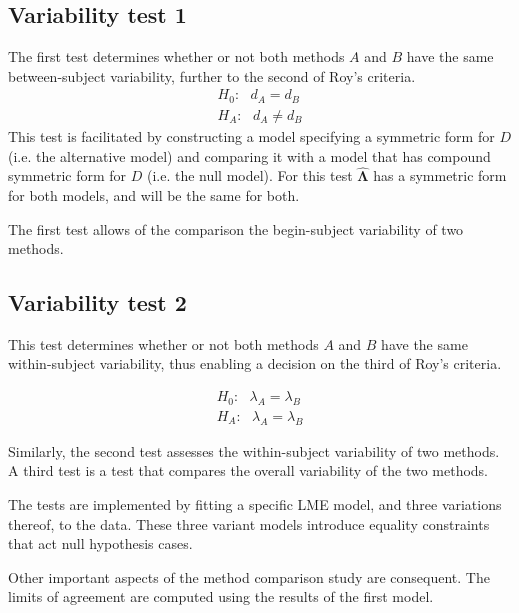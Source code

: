 \documentclass[12pt, a4paper]{article}
\theoremstyle{plain}
\theoremstyle{definition}
\theoremstyle{remark}
\begin{document}
			\subsection*{Variability test 1}
			The first test determines whether or not both methods $A$ and $B$ have the same between-subject variability, further to the second of Roy's criteria.
			\begin{eqnarray*}
				H_{0}: \mbox{ }d_{A}  = d_{B} \\
				H_{A}: \mbox{ }d_{A}  \neq d_{B}
			\end{eqnarray*}
			This test is facilitated by constructing a model specifying a symmetric form for $D$ (i.e. the alternative model) and comparing it with a model that has compound symmetric form for $D$ (i.e. the null model). For this test $\boldsymbol{\hat{\Lambda}}$ has a symmetric form for both models, and will be the same for both.
			

			
	The first test allows of the comparison the begin-subject variability of two methods. 
				\subsection*{Variability test 2}
				
				This test determines whether or not both methods $A$ and $B$ have the same within-subject variability, thus enabling a decision on the third of Roy's criteria.
				
				\begin{eqnarray*}
					H_{0}: \mbox{ }\lambda_{A}  = \lambda_{B} \\
					H_{A}: \mbox{ }\lambda_{A}  = \lambda_{B}
				\end{eqnarray*}
				
				Similarly, the second test
	assesses the within-subject variability of two methods. A third test is a test that compares the overall variability of the two methods.
	
	The tests are implemented by fitting a specific LME model, and three variations thereof, to the data. These three variant models introduce equality constraints that act null hypothesis cases.
	
	Other important aspects of the method comparison study are consequent. The limits of agreement are computed using the results of the first model.
	
\end{document}
